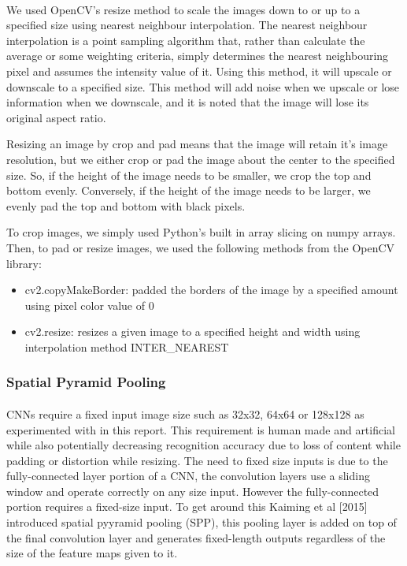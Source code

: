 \documentclass{article}
\begin{document}
\paragraph{}
We used OpenCV's resize method to scale the images down to or up to a specified size using nearest neighbour interpolation. The nearest neighbour interpolation is a point sampling algorithm that, rather than calculate the average or some weighting criteria, simply determines the nearest neighbouring pixel and assumes the intensity value of it. Using this method, it will upscale or downscale to a specified size. This method will add noise when we upscale or lose information when we downscale, and it is noted that the image will lose its original aspect ratio.
\par
Resizing an image by crop and pad means that the image will retain it's image resolution, but we either crop or pad the image about the center to the specified size. So, if the height of the image needs to be smaller, we crop the top and bottom evenly. Conversely, if the height of the image needs to be larger, we evenly pad the top and bottom with black pixels.	

To crop images, we simply used Python's built in array slicing on numpy arrays. Then, to pad or resize images, we used the following methods from the OpenCV library:
\begin{itemize}
	\item cv2.copyMakeBorder: padded the borders of the image by a specified amount using pixel color value of 0
	\item cv2.resize: resizes a given image to a specified height and width using interpolation method INTER\_NEAREST
\end{itemize}


\subsubsection{Spatial Pyramid Pooling}
\paragraph{}
CNNs require a fixed input image size such as 32x32, 64x64 or 128x128 as experimented with in this report. This requirement is human made and artificial while also potentially decreasing recognition accuracy due to loss of content while padding or distortion while resizing. The need to fixed size inputs is due to the fully-connected layer portion of a CNN, the convolution layers use a sliding window and operate correctly on any size input. However the fully-connected portion requires a fixed-size input. To get around this Kaiming et al [2015] introduced spatial pyyramid pooling (SPP), this pooling layer is added on top of the final convolution layer and generates fixed-length outputs regardless of the size of the feature maps given to it.  \\
\end{document}
